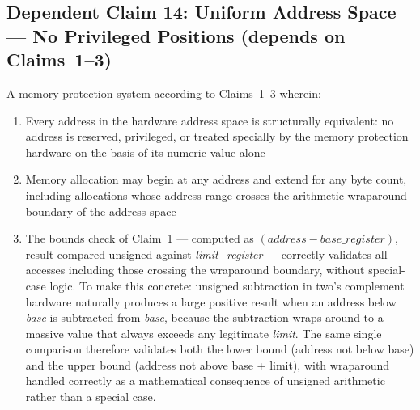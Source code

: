 \documentclass[12pt,letterpaper]{article}
\begin{document}
\subsection*{Dependent Claim 14: Uniform Address Space --- No Privileged
  Positions (depends on Claims~1--3)}

A memory protection system according to Claims~1--3 wherein:

\begin{enumerate}[label=(\alph*),noitemsep]
  \item Every address in the hardware address space is structurally
        equivalent: no address is reserved, privileged, or treated
        specially by the memory protection hardware on the basis of
        its numeric value alone

  \item Memory allocation may begin at any address and extend for
        any byte count, including allocations whose address range
        crosses the arithmetic wraparound boundary of the address
        space

  \item The bounds check of Claim~1 --- computed as
        $(\textit{address} - \textit{base\_register})$, result
        compared unsigned against \textit{limit\_register} ---
        correctly validates all accesses including those crossing
        the wraparound boundary, without special-case logic.
        To make this concrete: unsigned subtraction in two's
        complement hardware naturally produces a large positive
        result when an address below \textit{base} is subtracted
        from \textit{base}, because the subtraction wraps around
        to a massive value that always exceeds any legitimate \textit{limit}.
        The same single comparison therefore validates both the
        lower bound (address not below base) and the upper bound
        (address not above base + limit), with wraparound handled
        correctly as a mathematical consequence of unsigned
        arithmetic rather than a special case.


\end{enumerate}
\end{document}
